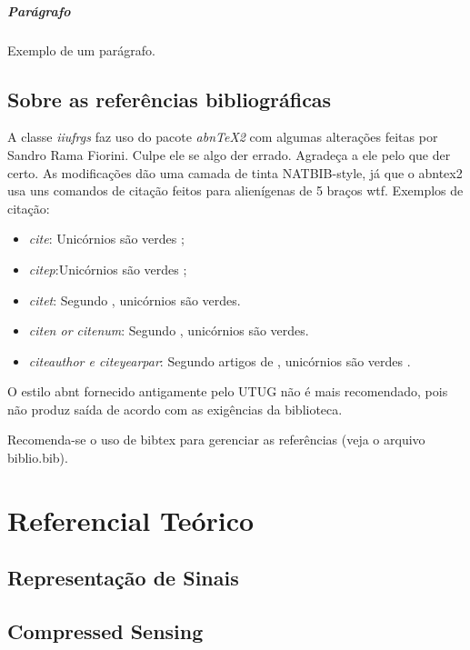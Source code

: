 \documentclass[cic,tc]{iiufrgs}
\begin{document}
\paragraph{Parágrafo}
Exemplo de um parágrafo.

\section{Sobre as referências bibliográficas}

A classe \emph{iiufrgs} faz uso do pacote \emph{abnTeX2} com algumas alterações
feitas por Sandro Rama Fiorini. Culpe ele se algo der errado. Agradeça a ele
pelo que der certo. As modificações dão uma camada de tinta NATBIB-style,
já que o abntex2 usa uns comandos de citação feitos para alienígenas de 5 braços
wtf. Exemplos de citação:

\begin{itemize}
    \item \emph{cite}: Unicórnios são verdes \cite{WirelessXiangCai};
    \item \emph{citep}:Unicórnios são verdes \citep{WirelessXiangCai};
    \item \emph{citet}: Segundo \citet{WirelessXiangCai}, unicórnios são
    verdes.
    \item \emph{citen or citenum}: Segundo ,
    unicórnios são verdes.
    \item \emph{citeauthor e citeyearpar}: Segundo artigos de
    \citeauthor{WirelessXiangCai} , unicórnios são verdes
    \citeyearpar{WirelessXiangCai}.

\end{itemize}

O estilo abnt fornecido antigamente pelo UTUG não é mais recomendado, pois não
produz saída de acordo com as exigências da biblioteca.

Recomenda-se o uso de bibtex para gerenciar as referências (veja o arquivo
biblio.bib).


\chapter{Referencial Teórico}

\section{Representação de Sinais}

\section{Compressed Sensing}
\end{document}
